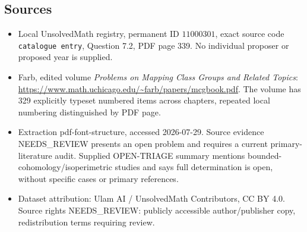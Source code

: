 \documentclass[11pt]{article}
\begin{document}
\subsection{Sources}
\begin{itemize}
\item Local UnsolvedMath registry, permanent ID \(11000301\), exact source code \texttt{catalogue entry}, Question 7.2, PDF page 339. No individual proposer or proposed year is supplied.
\item Farb, edited volume \emph{Problems on Mapping Class Groups and Related Topics}: \url{https://www.math.uchicago.edu/~farb/papers/mcgbook.pdf}. The volume has 329 explicitly typeset numbered items across chapters, repeated local numbering distinguished by PDF page.
\item Extraction pdf-font-structure, accessed 2026-07-29. Source evidence NEEDS\_REVIEW presents an open problem and requires a current primary-literature audit. Supplied OPEN-TRIAGE summary mentions bounded-cohomology/isoperimetric studies and says full determination is open, without specific cases or primary references.
\item Dataset attribution: Ulam AI / UnsolvedMath Contributors, CC BY 4.0. Source rights NEEDS\_REVIEW: publicly accessible author/publisher copy, redistribution terms requiring review.
\end{itemize}
\end{document}
